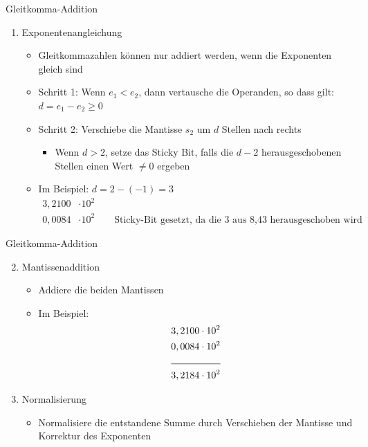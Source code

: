 \documentclass[12pt%
,xcolor=table
,aspectratio=169%
]{beamer}
\begin{document}
\begin{frame}{Gleitkomma-Addition}
\begin{enumerate}
	\item Exponentenangleichung
	\begin{itemize}
		\item Gleitkommazahlen können nur addiert werden, wenn die Exponenten gleich sind
		\item Schritt 1: Wenn $e_1 < e_2$, dann vertausche die Operanden, so dass gilt: $d = e_1 - e_2 \geq 0$
		\item Schritt 2: Verschiebe die Mantisse $s_2$ um $d$ Stellen nach rechts
		\begin{itemize}
			\item Wenn $d > 2$, setze das Sticky Bit, falls die $d-2$ herausgeschobenen Stellen einen Wert $\neq 0$ ergeben
		\end{itemize}
		\item Im Beispiel: $d = 2 - (-1) = 3$
		\begin{align*}
		3,2100 & \cdot 10^2\\
		0,0084 & \cdot 10^2 \qquad \text{Sticky-Bit gesetzt, da die 3 aus 8,43 herausgeschoben wird}
		\end{align*}
	\end{itemize}
\end{enumerate}
\end{frame}

\begin{frame}{Gleitkomma-Addition}
\begin{enumerate} \setcounter{enumi}{1}
	\item Mantissenaddition
	\begin{itemize}
		\item Addiere die beiden Mantissen
		\item Im Beispiel:
		\begin{align*}
		3,2100 & \cdot 10^2 \\
		0,0084 & \cdot 10^2 \\ \cline{1-2}
		3,2184 & \cdot 10^2
		\end{align*}
	\end{itemize}
	\item Normalisierung
	\begin{itemize}
		\item Normalisiere die entstandene Summe durch Verschieben der Mantisse und Korrektur des Exponenten
	\end{itemize}
\end{enumerate}
\end{frame}
\end{document}

